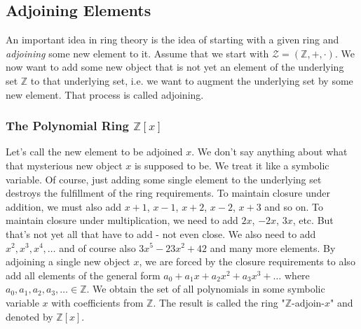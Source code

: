 





\subsection{Adjoining Elements}
An important idea in ring theory is the idea of starting with a given ring and \emph{adjoining} some new element to it. Assume that we start with $\mathcal{Z} = (\mathbb{Z},+,\cdot)$. We now want to add some new object that is not yet an element of the underlying set $\mathbb{Z}$ to that underlying set, i.e. we want to augment the underlying set by some new element. That process is called adjoining. 

\subsubsection{The Polynomial Ring $\mathbb{Z}[x]$}
Let's call the new element to be adjoined $x$. We don't say anything about what that mysterious new object $x$ is supposed to be. We treat it like a symbolic variable. Of course, just adding some single element to the underlying set destroys the fulfillment of the ring requirements. To maintain closure under addition, we must also add $x+1$, $x-1$, $x+2$, $x-2$, $x+3$ and so on. To maintain closure under multiplication, we need to add $2 x$, $-2 x$, $3 x$, etc. But that's not yet all that have to add - not even close. We also need to add $x^2, x^3, x^4, \ldots$ and of course also $3 x^5 - 23 x^2 + 42$ and many more elements. By adjoining a single new object $x$, we are forced by the closure requirements to also add all elements of the general form $a_0 + a_1 x + a_2 x^2 + a_3 x^3 + \ldots$ where $a_0, a_1, a_2, a_3, \ldots \in \mathbb{Z}$. We obtain the set of all polynomials in some symbolic variable $x$ with coefficients from $\mathbb{Z}$. The result is called the ring "$\mathbb{Z}$-adjoin-$x$" and denoted by $\mathbb{Z}[x]$.


